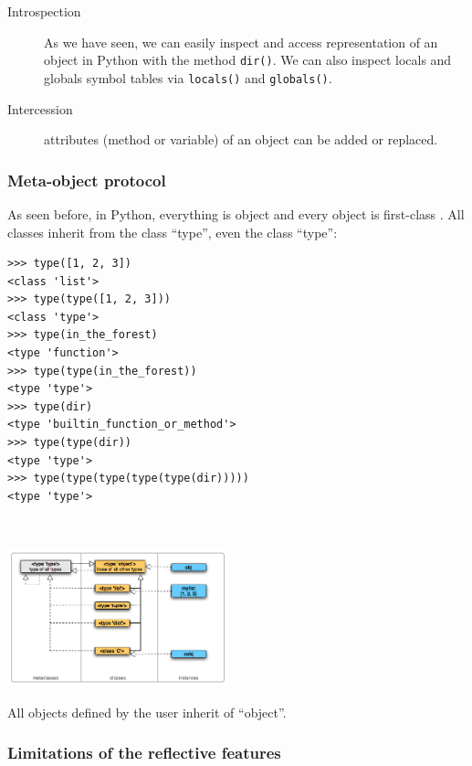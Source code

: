 \documentclass[a4paper,10pt]{article}
\begin{document}
\begin{description}
\item[Introspection] As we have seen, we can easily inspect and access representation of an object in Python with the method \lstinline|dir()|. We can also inspect locals and globals symbol tables via \lstinline|locals()| and \lstinline|globals()|.

\item[Intercession] attributes (method or variable) of an object can be added or replaced.
\end{description}

\subsubsection{Meta-object protocol}

As seen before, in Python, everything is object and every object is first-class \cite{python:first-class}. All classes inherit from the class ``type'', even the class ``type'':

\begin{minipage}[c]{.48\linewidth}
\begin{lstlisting}
>>> type([1, 2, 3])
<class 'list'>
>>> type(type([1, 2, 3]))
<class 'type'>
>>> type(in_the_forest)
<type 'function'>
>>> type(type(in_the_forest))
<type 'type'>
>>> type(dir)
<type 'builtin_function_or_method'>
>>> type(type(dir))
<type 'type'>
>>> type(type(type(type(type(dir)))))
<type 'type'>
\end{lstlisting}
~\\
\end{minipage} \hfill
\begin{minipage}[c]{.48\linewidth}
\includegraphics[height=4cm]{typesmap.png}
\end{minipage}

All objects defined by the user inherit of ``object''.

\subsubsection{Limitations of the reflective features}
\end{document}
